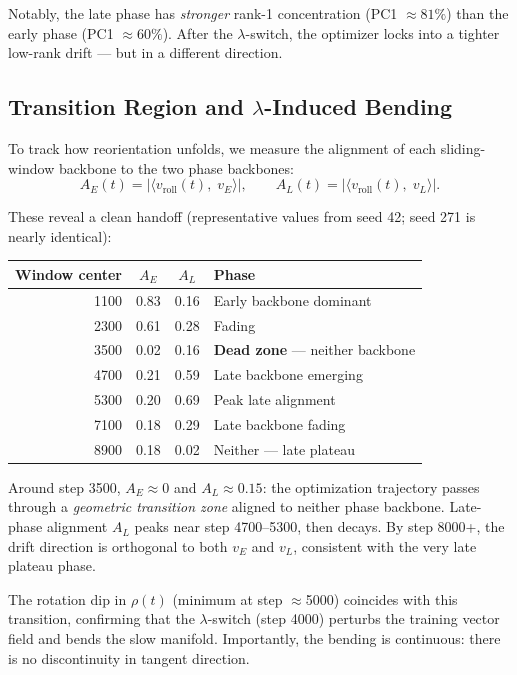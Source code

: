 \documentclass[11pt,a4paper]{article}
\begin{document}
Notably, the late phase has \emph{stronger} rank-1 concentration (PC1 $\approx 81\%$) than the early phase (PC1 $\approx 60\%$). After the $\lambda$-switch, the optimizer locks into a tighter low-rank drift --- but in a different direction.


\subsection{Transition Region and $\lambda$-Induced Bending}

To track how reorientation unfolds, we measure the alignment of each sliding-window backbone to the two phase backbones:
%
\[
A_E(t) = \bigl|\langle v_{\mathrm{roll}}(t),\; v_E \rangle\bigr|, \qquad
A_L(t) = \bigl|\langle v_{\mathrm{roll}}(t),\; v_L \rangle\bigr|.
\]

These reveal a clean handoff (representative values from seed 42; seed 271 is nearly identical):
%
\begin{center}
\begin{tabular}{rccl}
\toprule
Window center & $A_E$ & $A_L$ & Phase \\
\midrule
1100 & 0.83 & 0.16 & Early backbone dominant \\
2300 & 0.61 & 0.28 & Fading \\
3500 & 0.02 & 0.16 & \textbf{Dead zone} --- neither backbone \\
4700 & 0.21 & 0.59 & Late backbone emerging \\
5300 & 0.20 & 0.69 & Peak late alignment \\
7100 & 0.18 & 0.29 & Late backbone fading \\
8900 & 0.18 & 0.02 & Neither --- late plateau \\
\bottomrule
\end{tabular}
\end{center}

Around step 3500, $A_E \approx 0$ and $A_L \approx 0.15$: the optimization trajectory passes through a \emph{geometric transition zone} aligned to neither phase backbone. Late-phase alignment $A_L$ peaks near step 4700--5300, then decays. By step 8000+, the drift direction is orthogonal to both $v_E$ and $v_L$, consistent with the very late plateau phase.

The rotation dip in $\rho(t)$ (minimum at step $\approx$5000) coincides with this transition, confirming that the $\lambda$-switch (step 4000) perturbs the training vector field and bends the slow manifold. Importantly, the bending is continuous: there is no discontinuity in tangent direction.
\end{document}
